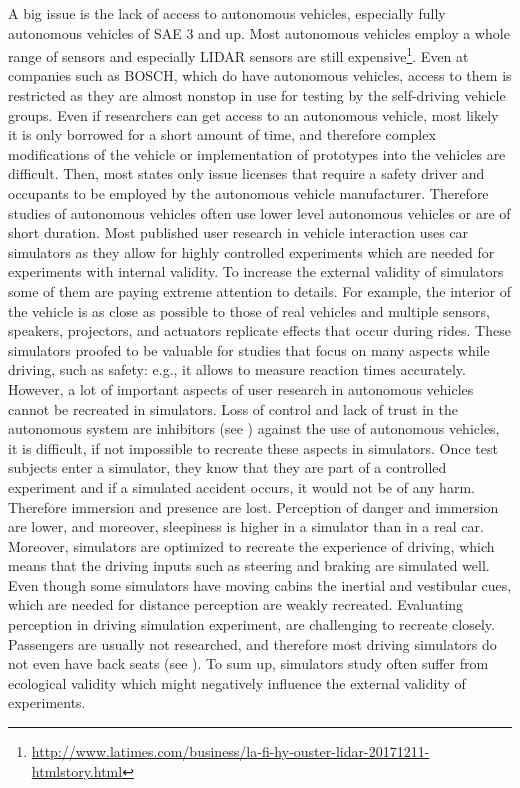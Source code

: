 A big issue is the lack of access to autonomous vehicles, especially fully autonomous vehicles of SAE 3 and up. Most autonomous vehicles employ a whole range of sensors and especially LIDAR sensors are still expensive\footnote{\url{http://www.latimes.com/business/la-fi-hy-ouster-lidar-20171211-htmlstory.html}}. Even at companies such as BOSCH, which do have autonomous vehicles, access to them is restricted as they are almost nonstop in use for testing by the self-driving vehicle groups. Even if researchers can get access to an autonomous vehicle, most likely it is only borrowed for a short amount of time, and therefore complex modifications of the vehicle or implementation of prototypes into the vehicles are difficult. Then, most states only issue licenses that require a safety driver and occupants to be employed by the autonomous vehicle manufacturer\cite{Jones2013AutonomousReport}. Therefore studies of autonomous vehicles often use lower level autonomous vehicles or are of short duration. 
Most published user research in vehicle interaction uses car simulators as they allow for highly controlled experiments which are needed for experiments with internal validity. To increase the external validity of simulators some of them are paying extreme attention to details. For example, the interior of the vehicle is as close as possible to those of real vehicles and multiple sensors, speakers, projectors, and actuators replicate effects that occur during rides. These simulators proofed to be valuable for studies that focus on many aspects while driving, such as safety: e.g., it allows to measure reaction times accurately. However, a lot of important aspects of user research in autonomous vehicles cannot be recreated in simulators. Loss of control and lack of trust in the autonomous system are inhibitors (see ) against the use of autonomous vehicles, it is difficult, if not impossible to recreate these aspects in simulators. Once test subjects enter a simulator, they know that they are part of a controlled experiment and if a simulated accident occurs, it would not be of any harm. Therefore immersion and presence are lost. Perception of danger and immersion are lower, and moreover, sleepiness is higher in a simulator than in a real car\cite{Hallvig2013}.
Moreover, simulators are optimized to recreate the experience of driving, which means that the driving inputs such as steering and braking are simulated well. Even though some simulators have moving cabins the inertial and vestibular cues, which are needed for distance perception are weakly recreated. Evaluating perception in driving simulation experiment, are challenging to recreate closely. Passengers are usually not researched, and therefore most driving simulators do not even have back seats (see ).  To sum up, simulators study often suffer from ecological validity which might negatively influence the external validity of experiments. 

